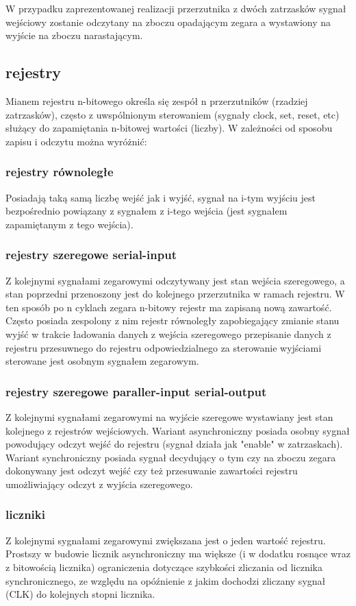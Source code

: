 \documentclass{pdfBooklets}
\begin{document}
W przypadku zaprezentowanej realizacji przerzutnika z dwóch zatrzasków sygnał wejściowy zostanie odczytany na zboczu opadającym zegara a wystawiony na wyjście na zboczu narastającym.

\subsection{rejestry}
Mianem rejestru n-bitowego określa się zespół n przerzutników (rzadziej zatrzasków), często z uwspólnionym sterowaniem (sygnały clock, set, reset, etc) służący do zapamiętania n-bitowej wartości (liczby). W zależności od sposobu zapisu i odczytu można wyróżnić:

\subsubsection{rejestry równoległe}
Posiadają taką samą liczbę wejść jak i wyjść, sygnał na i-tym wyjściu jest bezpośrednio powiązany z sygnałem z i-tego wejścia (jest sygnałem zapamiętanym z tego wejścia).
\subsubsection{rejestry szeregowe serial-input}
Z kolejnymi sygnałami zegarowymi odczytywany jest stan wejścia szeregowego, a stan poprzedni przenoszony jest do kolejnego przerzutnika w ramach rejestru. W ten sposób po n cyklach zegara n-bitowy rejestr ma zapisaną nową zawartość. Często posiada zespolony z nim rejestr równoległy zapobiegający zmianie stanu wyjść w trakcie ładowania danych z wejścia szeregowego przepisanie danych z rejestru przesuwnego do rejestru odpowiedzialnego za sterowanie wyjściami sterowane jest osobnym sygnałem zegarowym.
\subsubsection{rejestry szeregowe paraller-input serial-output}
Z kolejnymi sygnałami zegarowymi na wyjście szeregowe wystawiany jest stan kolejnego z rejestrów wejściowych. Wariant asynchroniczny posiada osobny sygnał powodujący odczyt wejść do rejestru (sygnał działa jak "enable" w zatrzaskach). Wariant synchroniczny posiada sygnał decydujący o tym czy na zboczu zegara dokonywany jest odczyt wejść czy też przesuwanie zawartości rejestru umożliwiający odczyt z wyjścia szeregowego.
\subsubsection{liczniki}
Z kolejnymi sygnałami zegarowymi zwiększana jest o jeden wartość rejestru. Prostszy w budowie licznik asynchroniczny ma większe (i w dodatku rosnące wraz z bitowością licznika) ograniczenia dotyczące szybkości zliczania od licznika synchronicznego, ze względu na opóźnienie z jakim dochodzi zliczany sygnał (CLK) do kolejnych stopni licznika.
\end{document}
